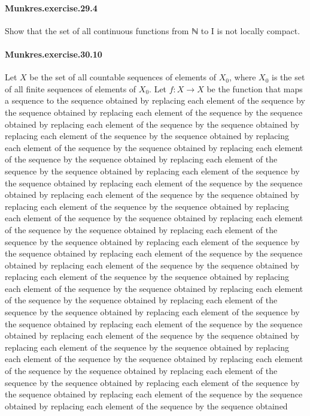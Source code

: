 \documentclass{article}
\begin{document}
\paragraph{Munkres.exercise.29.4} Show that the set of all
  continuous functions from ℕ to I is not locally compact.

\paragraph{Munkres.exercise.30.10} Let $X$ be the set of all countable sequences of elements of $X_0$, where $X_0$ is the set of all finite sequences of elements of $X_0$. Let $f : X → X$ be the function that maps a sequence to the sequence obtained by replacing each element of the sequence by the sequence obtained by replacing each element of the sequence by the sequence obtained by replacing each element of the sequence by the sequence obtained by replacing each element of the sequence by the sequence obtained by replacing each element of the sequence by the sequence obtained by replacing each element of the sequence by the sequence obtained by replacing each element of the sequence by the sequence obtained by replacing each element of the sequence by the sequence obtained by replacing each element of the sequence by the sequence obtained by replacing each element of the sequence by the sequence obtained by replacing each element of the sequence by the sequence obtained by replacing each element of the sequence by the sequence obtained by replacing each element of the sequence by the sequence obtained by replacing each element of the sequence by the sequence obtained by replacing each element of the sequence by the sequence obtained by replacing each element of the sequence by the sequence obtained by replacing each element of the sequence by the sequence obtained by replacing each element of the sequence by the sequence obtained by replacing each element of the sequence by the sequence obtained by replacing each element of the sequence by the sequence obtained by replacing each element of the sequence by the sequence obtained by replacing each element of the sequence by the sequence obtained by replacing each element of the sequence by the sequence obtained by replacing each element of the sequence by the sequence obtained by replacing each element of the sequence by the sequence obtained by replacing each element of the sequence by the sequence obtained by replacing each element of the sequence by the sequence obtained by replacing each element of the sequence by the sequence obtained by replacing each element of the sequence by the sequence obtained by replacing each element of the sequence by the sequence obtained by replacing each element of the sequence by the sequence obtained
\end{document}
